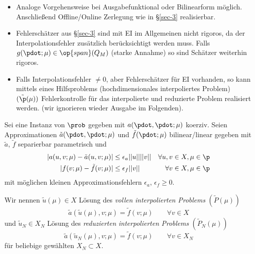 \begin{bem} \beginwithlistbem
	\begin{itemize}
		\item Analoge Vorgehensweise bei Ausgabefunktional oder Bilinearform möglich. Anschließend Offline/Online Zerlegung wie in §\ref{sec-3} realisierbar.
		\item Fehlerschätzer aus §\ref{sec-3} sind mit EI  im Allgemeinen nicht rigoros, da der Interpolationsfehler zusätzlich berücksichtigt werden muss. Falls $g(\pdot;\mu) \in \op{span} (Q_M)$ (starke Annahme) so sind Schätzer weiterhin rigoros.
		\item Falls Interpolationsfehler $\neq 0$, aber Fehlerschätzer für EI vorhanden, so kann mittels eines Hilfsproblems (hochdimensionales interpoliertes Problem) $(\tilde{\p}(\mu))$ Fehlerkontrolle für das interpolierte und reduzierte Problem realisiert werden. (wir ignorieren wieder Ausgabe im Folgenden).
	\end{itemize}
\end{bem}

\begin{defn} \label{4.8}
Sei eine Instanz von $\prob$ gegeben mit $a(\pdot,\pdot;\mu)$ koerziv. Seien Approximationen $\tilde{a}(\pdot,\pdot;\mu)$ und $\tilde{f}(\pdot;\mu)$ bilinear/linear gegeben mit $\tilde{a}$, $\tilde{f}$ separierbar parametrisch und
\begin{align*}
	| a(u,v;\mu) - \tilde{a}(u,v;\mu) | &\leq \epsilon_a ||u|| ||v|| &\forall u,v \in X, \mu \in \p \\
	|f(v;\mu) - \tilde{f}(v;\mu) | &\leq \epsilon_f ||v|| &\forall v \in X, \mu \in \p
\end{align*} 
mit möglichen kleinen Approximationsfehlern $\epsilon_a$, $\epsilon_f \geq 0$.

Wir nennen $\tilde{u}(\mu) \in X$ Lösung des \emph{vollen interpolierten Problems} $(\tilde{P}(\mu))$
\[
	\tilde{a}(\tilde{u}(\mu),v;\mu) = \tilde{f}(v;\mu)	\qquad \forall v \in X
\]
und $\tilde{u}_N \in X_N$ Lösung des \emph{reduzierten interpolierten Problems} $(\tilde{P}_N(\mu))$
\[
	\tilde{a}(\tilde{u}_N(\mu),v;\mu) = \tilde{f}(v;\mu)	\qquad \forall v \in X_N
\]
für beliebige gewählten $X_N \subset X$.
\end{defn}

